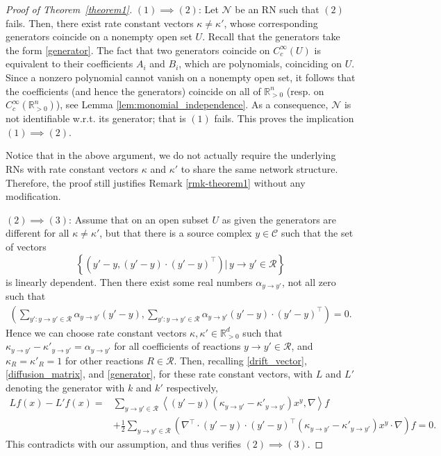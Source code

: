 \documentclass[10pt,a4paper]{amsart}
\theoremstyle{definition}
\theoremstyle{remark}
\theoremstyle{consequence}
\def\k{\kappa}
\def\cN{\mathcal{N}}
\def\cR{\mathcal{R}}
\def\cC{\mathcal{C}}
\def\R{\mathbb{R}}
\numberwithin{equation}{section}
\begin{document}
\begin{proof}[Proof of Theorem~\ref{theorem1}]$(1)\implies (2)$: Let $\cN$ be an RN such that $(2)$ fails. Then, there exist rate constant vectors $\kappa \neq \kappa'$, whose corresponding generators coincide on a nonempty open set $U$. Recall that the generators take the form \eqref{generator}. The fact that two generators coincide on $C_c^{\infty} (U)$ is equivalent to their coefficients $A_i$ and $B_i$, which are polynomials, coinciding on $U$. Since a nonzero polynomial cannot vanish on a nonempty open set, it follows that the coefficients (and hence the generators) coincide on all of $\R^n_{>0}$ (resp. on $C^\infty_c(\mathbb{R}^n_{>0})$), see Lemma \ref{lem:monomial_independence}. As a consequence, $\cN$ is not identifiable w.r.t. its generator; that is $(1)$ fails. This proves the implication $(1) \implies (2)$.

Notice that in the above argument, we do not actually require the underlying RNs with rate constant vectors $\kappa$ and $\kappa'$ to share the same network structure. Therefore, the proof still justifies Remark \ref{rmk-theorem1} without any modification.


$(2) \implies (3)$: Assume that on an open subset $U$ as given the generators are different for all $\kappa \neq \kappa'$, but that there is a source complex $y \in \cC$ such that the set of vectors 
$$\left\{\left(y' - y,(y' - y)\cdot (y' - y)^{\intercal}\right) \big| \, y\to y'\in\cR\right\}$$
is linearly dependent. Then there exist some real numbers $\alpha_{y\to y'}$, not all zero  such that
\begin{align*}
\left(\sum_{y' \colon y \to y'\in\cR} \alpha_{y\to y'}(y' - y),\sum_{y' \colon y \to y'\in\cR} \alpha_{y\to y'} (y' - y)\cdot (y' - y)^{\intercal} \right)  
= 0.
\end{align*}
Hence we can choose rate constant vectors $\k,\k' \in \R^{d}_{>0}$ such that $\k_{y \to y'}- \k'_{y \to y'} = \alpha_{y \to y'}$ for all coefficients of reactions $y \to y'\in\cR$, and $\k_{R} = \k'_{R} = 1$ for other reactions $R \in\cR$. Then, recalling \eqref{drift_vector}, \eqref{diffusion_matrix}, and \eqref{generator}, for these rate constant vectors,
with $L$ and $L'$ denoting the generator with $k$ and $k'$ respectively,
\begin{align*}
 L f(x) - L' f(x) = & \sum_{y\to y'\in \cR} \left\langle (y' - y)(\k_{y\to y'}-\k'_{y\to y'})x^y, \nabla\right\rangle f \\ 
& + \frac{1}{2} \sum_{y\to y'\in \cR} \left(\nabla^{\intercal} \cdot (y' - y)\cdot(y' - y)^{\intercal}(\k_{y\to y'}-\k'_{y\to y'}) x^y \cdot \nabla \right) f  = 0.
\end{align*}
This contradicts with our assumption, and thus verifies $(2) \implies (3)$.


\end{proof}
\end{document}
